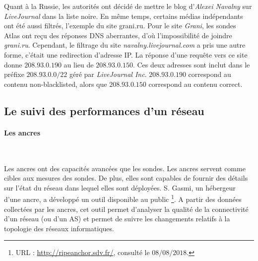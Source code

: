 Quant à la Russie, les autorités ont décidé de mettre le blog d'\textit{Alexei Navalny} sur  \textit{LiveJournal}  dans la liste noire. En même temps, certains médias indépendants ont été aussi filtrés, l'exemple du site grani.ru.  Pour le site  \textit{Grani}, les sondes Atlas ont reçu des réponses DNS aberrantes, d'où l'impossibilité de joindre   \textit{grani.ru}. Cependant, le filtrage du site \textit{navalny.livejournal.com}  a pris une autre forme, c'était une redirection d'adresse IP. La réponse d'une requête vers ce site donne $208.93.0.190$  au lieu de $ 208.93.0.150$. Ces deux adresses sont inclut dans le préfixe $208.93.0.0/22$ géré par \textit{LiveJournal Inc}. 
$208.93.0.190$  correspond au contenu  non-blacklisted, alors que  $ 208.93.0.150$ correspond au contenu correct.

\subsection{Le suivi des performances d'un réseau}
\paragraph{Les ancres}~

Les ancres  ont des capacités avancées que les sondes. Les ancres servent comme cibles aux mesures des sondes. De plus, elles sont capables de fournir des détails sur l'état du réseau dans lequel elles sont déployées.  S. Gasmi, un hébergeur d'une ancre, a développé un outil  disponible au public \footnote{URL : \url{http://ripeanchor.sdv.fr/}, consulté le $08/08/2018$.}. 
A partir des données collectées par les ancres, cet outil permet d'analyser  la qualité de la connectivité d'un réseau (ou d'un AS) et permet de suivre les changements relatifs à la topologie des réseaux informatiques.

